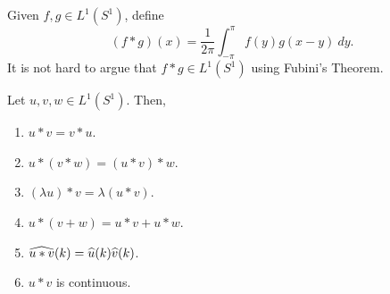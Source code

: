 \begin{definition}
    Given $f,g\in L^1(S^1)$, define 
    \begin{equation*}
        (f\ast g)(x) = \frac{1}{2\pi}\int_{-\pi}^{\pi}f(y)g(x - y)~dy.
    \end{equation*}
    It is not hard to argue that $f\ast g\in L^1(S^1)$ using Fubini's Theorem.
\end{definition}

\begin{proposition}
    Let $u,v,w\in L^1(S^1)$. Then, 
    \begin{enumerate}[label=(\alph*)]
        \item $u\ast v = v\ast u$.
        \item $u\ast (v\ast w) = (u\ast v)\ast w$.
        \item $(\lambda u)\ast v = \lambda(u\ast v)$.
        \item $u\ast(v + w) = u\ast v + u\ast w$.
        \item $\widehat{u\ast v}(k) = \widehat{u}(k)\widehat{v}(k)$.
        \item $u\ast v$ is continuous.
    \end{enumerate}
\end{proposition}